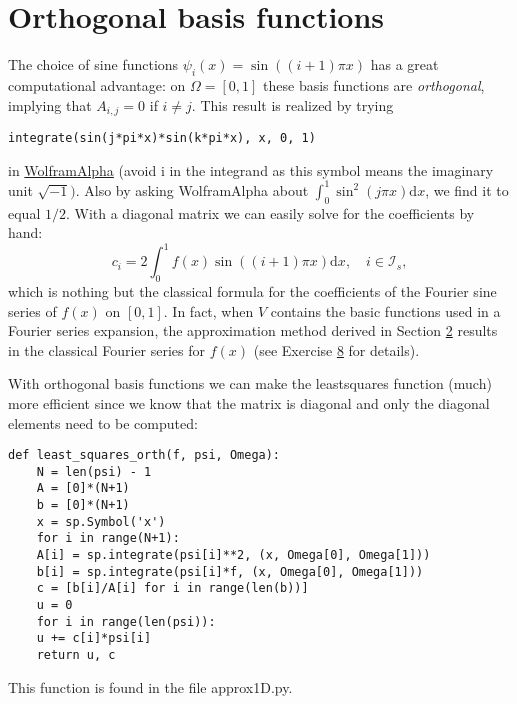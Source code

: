 \documentclass[../main.tex]{subfiles}
\begin{document}
\section[Orthogonal basis functions]{Orthogonal basis functions}
\label{sec:sec_2_8}
The choice of sine functions $\psi_{i}(x)=\sin ((i+1) \pi x)$ has a great computational advantage: on $\Omega=[0,1]$ these basis functions are \textit{orthogonal}, implying that $A_{i, j}=0$ if $i \neq j$. This result is realized by trying
\begin{lstlisting}[numbers=none]
integrate(sin(j*pi*x)*sin(k*pi*x), x, 0, 1)
\end{lstlisting}
in \href{https://www.wolframalpha.com/}{WolframAlpha} (avoid i in the integrand as this symbol means the imaginary unit $\sqrt{-1})$. Also by asking WolframAlpha about $\int_{0}^{1} \sin ^{2}(j \pi x) \mathrm{d} x$, we find it to equal $1 / 2$. With a diagonal matrix we can easily solve for the coefficients by hand:
\begin{equation}\label{eqa41}
	c_{i}=2 \int_{0}^{1} f(x) \sin ((i+1) \pi x) \mathrm{d} x, \quad i \in \mathcal{I}_{s},
\end{equation}
which is nothing but the classical formula for the coefficients of the Fourier sine series of $f(x)$ on $[0,1]$. In fact, when $V$ contains the basic functions used in a Fourier series expansion, the approximation method derived in Section \hyperref[chap:chap_2]{2} results in the classical Fourier series for $f(x)$ (see Exercise \hyperref[sec:sec_10_8]{8} for details).

With orthogonal basis functions we can make the least\textunderscore squares function (much) more efficient since we know that the matrix is diagonal and only the diagonal elements need to be computed:
\begin{lstlisting}[numbers=none]
def least_squares_orth(f, psi, Omega):
	N = len(psi) - 1
	A = [0]*(N+1)
	b = [0]*(N+1)
	x = sp.Symbol('x')
	for i in range(N+1):
	A[i] = sp.integrate(psi[i]**2, (x, Omega[0], Omega[1]))
	b[i] = sp.integrate(psi[i]*f, (x, Omega[0], Omega[1]))
	c = [b[i]/A[i] for i in range(len(b))]
	u = 0
	for i in range(len(psi)):
	u += c[i]*psi[i]
	return u, c
\end{lstlisting}
This function is found in the file approx1D.py.
\end{document}
